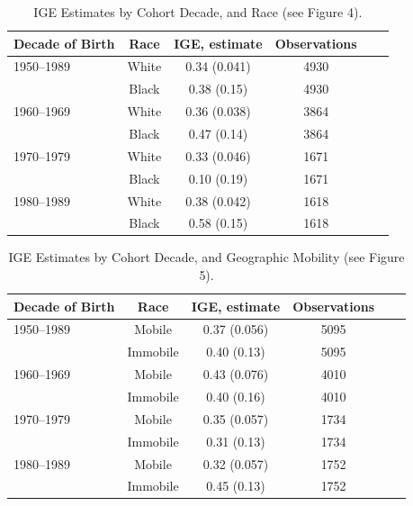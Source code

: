 \documentclass[notitlepage,12pt]{article}
\begin{document}
\begin{table}[H]
\centering
\caption{IGE Estimates by Cohort Decade, and Race (see Figure 4).}
\begin{tabular}{lc|cccc}
\midrule
Decade of Birth & Race & IGE, estimate         & Observations & \\
\midrule
1950--1989  & White & 0.34 (0.041)  &4930  \\
& Black  &   0.38 (0.15) & 4930\\ \hline
1960--1969  & White & 0.36 (0.038) &3864   \\
& Black    & 0.47 (0.14) & 3864\\ \hline
1970--1979  & White & 0.33 (0.046) &1671 \\
& Black  &  0.10 (0.19) & 1671 \\ \hline
1980--1989  & White &  0.38 (0.042) & 1618  \\
& Black  &  0.58 (0.15) & 1618 \\ 
\midrule \bottomrule
\end{tabular}
\end{table}

\begin{table}[H]
\centering
\caption{IGE Estimates by Cohort Decade, and Geographic Mobility (see Figure 5).}
\begin{tabular}{lc|cccc}
\midrule
Decade of Birth & Race & IGE, estimate          & Observations & \\
\midrule
1950--1989  & Mobile & 0.37 (0.056)  &5095  \\
& Immobile  &   0.40  (0.13)  & 5095\\ \hline
1960--1969  & Mobile & 0.43 (0.076) &4010   \\
& Immobile    & 0.40 (0.16) & 4010\\ \hline
1970--1979  & Mobile  &  0.35  (0.057)&1734 \\
& Immobile  &  0.31 (0.13) & 1734 \\ \hline
1980--1989  & Mobile  & 0.32 (0.057) & 1752 \\
& Immobile  &  0.45 (0.13) & 1752 \\ 
\midrule \bottomrule
\end{tabular}
\end{table}
\end{document}
